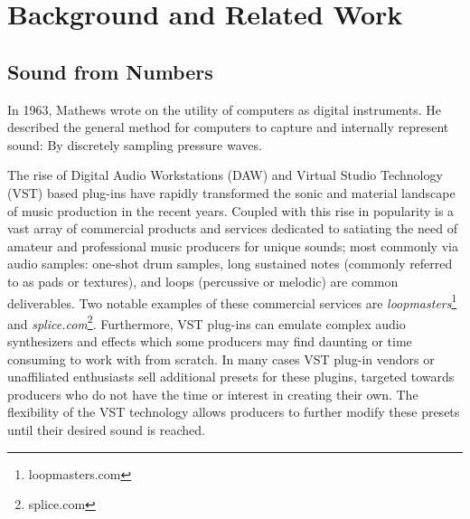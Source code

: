 \documentclass[\main/thesis.tex]{subfiles}
\begin{document}
\chapter{Background and Related Work}
\section{Sound from Numbers}
In 1963, Mathews \cite{mathews1963digital} wrote on the utility of computers as digital instruments. He described the general method for computers to capture and internally represent sound: By discretely sampling pressure waves. 



The rise of Digital Audio Workstations (DAW) \cite{leider2004digital} and Virtual Studio Technology (VST) based plug-ins \cite{tanev2013virtual} have rapidly transformed the sonic and material landscape of music production in the recent years. Coupled with this rise in popularity is a vast array of commercial products and services dedicated to satiating the need of amateur and professional music producers for unique sounds; most commonly via audio samples: one-shot drum samples, long sustained notes (commonly referred to as pads or textures), and loops (percussive or melodic) are common deliverables. Two notable examples of these commercial services are \textit{loopmasters}\footnote{loopmasters.com} and \textit{splice.com}\footnote{splice.com}. Furthermore, VST plug-ins can emulate complex audio synthesizers and effects which some producers may find daunting or time consuming to work with from scratch. In many cases VST plug-in vendors or unaffiliated enthusiasts sell additional presets for these plugins, targeted towards producers who do not have the time or interest in creating their own. The flexibility of the VST technology allows producers to further modify these presets until their desired sound is reached.
\end{document}

